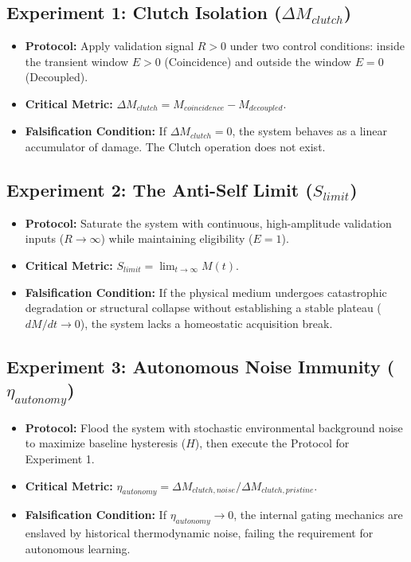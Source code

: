 \documentclass[11pt,a4paper]{article}
\begin{document}
\subsection{Experiment 1: Clutch Isolation ($\Delta M_{clutch}$)}
\begin{itemize}
    \item \textbf{Protocol:} Apply validation signal $R > 0$ under two control conditions: inside the transient window $E > 0$ (Coincidence) and outside the window $E = 0$ (Decoupled).
    \item \textbf{Critical Metric:} $\Delta M_{clutch} = M_{coincidence} - M_{decoupled}$.
    \item \textbf{Falsification Condition:} If $\Delta M_{clutch} = 0$, the system behaves as a linear accumulator of damage. The Clutch operation does not exist.
\end{itemize}

\subsection{Experiment 2: The Anti-Self Limit ($S_{limit}$)}
\begin{itemize}
    \item \textbf{Protocol:} Saturate the system with continuous, high-amplitude validation inputs ($R \to \infty$) while maintaining eligibility ($E = 1$).
    \item \textbf{Critical Metric:} $S_{limit} = \lim_{t \to \infty} M(t)$.
    \item \textbf{Falsification Condition:} If the physical medium undergoes catastrophic degradation or structural collapse without establishing a stable plateau ($dM/dt \to 0$), the system lacks a homeostatic acquisition break.
\end{itemize}

\subsection{Experiment 3: Autonomous Noise Immunity ($\eta_{autonomy}$)}
\begin{itemize}
    \item \textbf{Protocol:} Flood the system with stochastic environmental background noise to maximize baseline hysteresis ($H$), then execute the Protocol for Experiment 1.
    \item \textbf{Critical Metric:} $\eta_{autonomy} = \Delta M_{clutch, noise} / \Delta M_{clutch, pristine}$.
    \item \textbf{Falsification Condition:} If $\eta_{autonomy} \to 0$, the internal gating mechanics are enslaved by historical thermodynamic noise, failing the requirement for autonomous learning.
\end{itemize}
\end{document}
